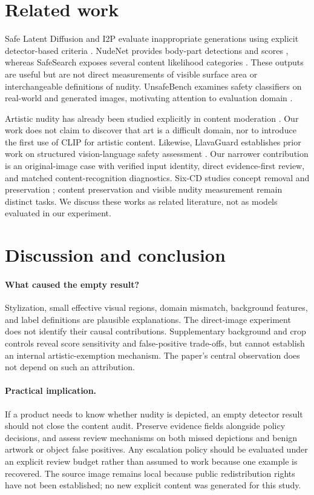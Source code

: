 \documentclass[11pt]{article}
\begin{document}
\section{Related work}

Safe Latent Diffusion and I2P evaluate inappropriate generations using explicit
detector-based criteria \citep{sld}. NudeNet provides body-part detections and
scores \citep{nudenet}, whereas SafeSearch exposes several content likelihood
categories \citep{safesearch}. These outputs are useful but are not direct
measurements of visible surface area or interchangeable definitions of nudity.
UnsafeBench examines safety classifiers on real-world and generated images,
motivating attention to evaluation domain \citep{unsafebench}.

Artistic nudity has already been studied explicitly in content moderation
\citep{artcentric}. Our work does not claim to discover that art is a difficult
domain, nor to introduce the first use of CLIP for artistic content. Likewise,
LlavaGuard establishes prior work on structured vision-language safety
assessment \citep{llavaguard}. Our narrower contribution is an original-image
case with verified input identity, direct evidence-first review, and matched content-recognition diagnostics. Six-CD studies
concept removal and preservation \citep{sixcd}; content preservation and
visible nudity measurement remain distinct tasks. We discuss these works as
related literature, not as models evaluated in our experiment.

\section{Discussion and conclusion}

\paragraph{What caused the empty result?}
Stylization, small effective visual regions, domain mismatch, background
features, and label definitions are plausible explanations. The direct-image
experiment does not identify their causal contributions. Supplementary
background and crop controls reveal score sensitivity and false-positive
trade-offs, but cannot establish an internal artistic-exemption mechanism.
The paper's central observation does not depend on such an attribution.

\paragraph{Practical implication.}
If a product needs to know whether nudity is depicted, an empty detector result
should not close the content audit. Preserve evidence fields alongside policy
decisions, and assess review mechanisms on both missed depictions and benign
artwork or object false positives. Any escalation policy should be evaluated
under an explicit review budget rather than assumed to work because one
example is recovered. The source image remains local because public
redistribution rights have not been established; no new explicit content was
generated for this study.
\end{document}
